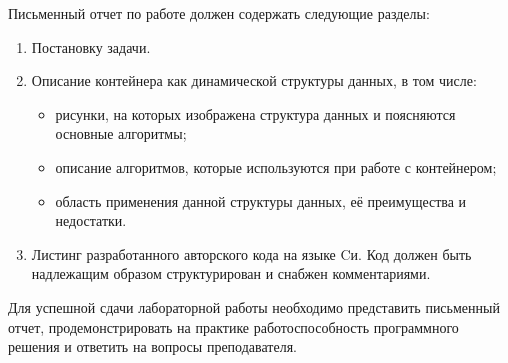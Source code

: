 Письменный отчет по работе должен содержать следующие разделы: 
\begin{enumerate}
\item Постановку задачи. 

\item Описание контейнера как динамической структуры данных, в том числе: 
\begin{itemize}
	\item рисунки, на которых изображена структура данных и поясняются основные алгоритмы;
	\item описание алгоритмов, которые используются при работе с контейнером; 
	\item область применения данной структуры данных, её преимущества и недостатки. 
\end{itemize}
\item  Листинг разработанного авторского кода на языке Cи. 
Код должен быть надлежащим образом структурирован и снабжен комментариями. 
\end{enumerate}

Для успешной сдачи лабораторной работы необходимо представить письменный отчет, продемонстрировать на практике работоспособность программного решения и ответить на вопросы преподавателя. 

